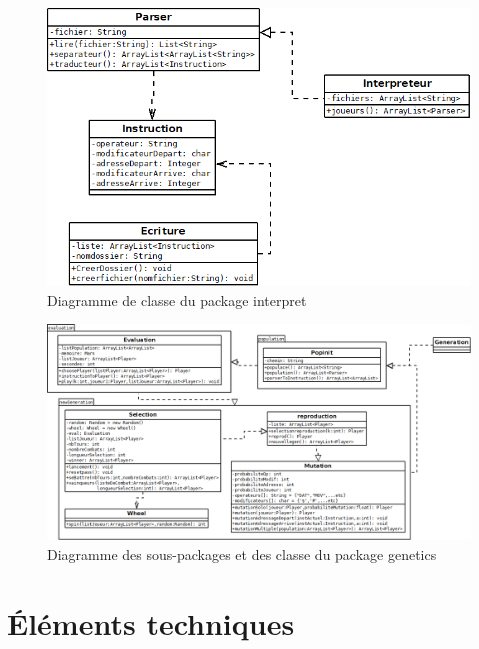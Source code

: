\documentclass[a4paper,12pt]{article}
\begin{document}
\begin{figure}[H]
\includegraphics[scale=0.6]{diagrammeinterpret.png}
\caption{Diagramme de classe du package interpret}
\end{figure}
\begin{figure}[H]
\includegraphics[scale=0.4]{diagrammegenetics.png}
\caption{Diagramme des sous-packages et des classe du package genetics}
\end{figure}
\section{Éléments techniques}
\end{document}
